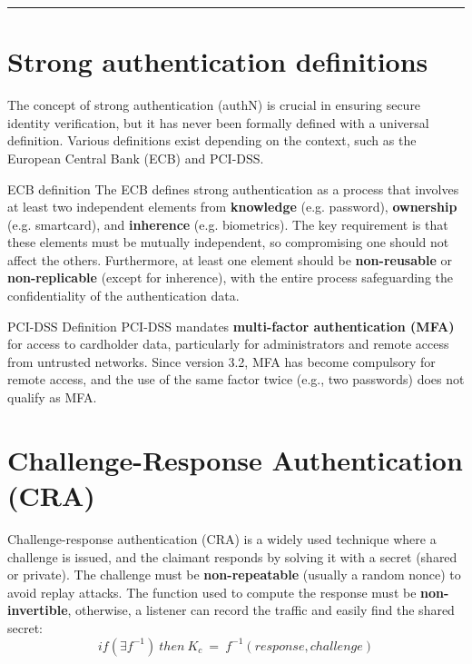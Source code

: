 \noindent\rule{1\textwidth}{0.00001pt}

\section{Strong authentication definitions}
The concept of strong authentication (authN) is crucial in ensuring secure identity verification, but it has never been formally defined with a universal definition.
Various definitions exist depending on the context, such as the European Central Bank (ECB) and PCI-DSS.

\begin{quotebox}[colframe=blue!10!white, colback=blue!5!white]{ECB definition}
    The ECB defines strong authentication as a process that involves at least two independent 
    elements from \textbf{knowledge} (e.g. password), \textbf{ownership} (e.g. smartcard), 
    and \textbf{inherence} (e.g. biometrics). The key requirement is that these elements 
    must be mutually independent, so compromising one should not affect the others. 
    Furthermore, at least one element should be \textbf{non-reusable} or \textbf{non-replicable} 
    (except for inherence), with the entire process safeguarding the confidentiality of the 
    authentication data.
\end{quotebox}

\begin{quotebox}[colframe=blue!10!white, colback=blue!5!white]{PCI-DSS Definition}
    PCI-DSS mandates \textbf{multi-factor authentication (MFA)} for access to cardholder data, 
    particularly for administrators and remote access from untrusted networks. Since version 3.2, MFA has become compulsory for remote access, 
    and the use of the same factor twice (e.g., two passwords) does not qualify as MFA.
\end{quotebox}

\section{Challenge-Response Authentication (CRA)}
Challenge-response authentication (CRA) is a widely used technique where 
a challenge is issued, and the claimant responds by solving it with a 
secret (shared or private). The challenge must be \textbf{non-repeatable} 
(usually a random nonce) to avoid replay attacks. The function used to compute 
the response must be \textbf{non-invertible}, otherwise, a listener can record the 
traffic and easily find the shared secret:
\[ if(\exists f^{-1})\ then\ K_c\ =\ f^{-1}(response, challenge)\]

